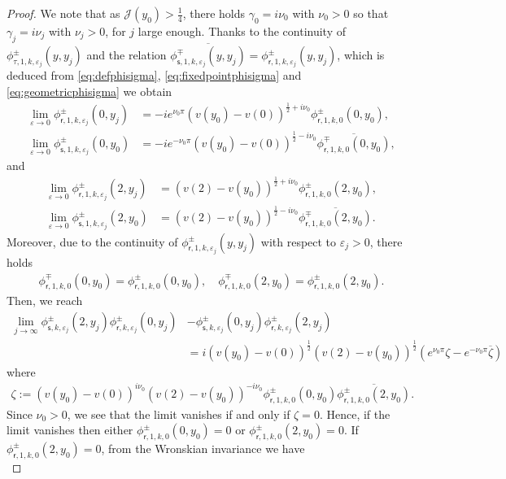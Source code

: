 \documentclass[11pt,reqno]{amsproc}
\theoremstyle{definition}
\numberwithin{equation}{section}
\newcommand{\cJ}{{\mathcal{J}}}
\newcommand{\sr}{{\mathsf{r}}}
\newcommand{\s}{{\mathsf{s}}}
\newcommand{\ep}{\varepsilon}
\begin{document}
\begin{proof}
We note that as $\cJ(y_0)>\frac14$, there holds $\gamma_0 = i \nu_0$ with $\nu_0>0$ so that $\gamma_j = i\nu_j$ with $\nu_j>0$, for $j$ large enough. Thanks to the continuity of $\phi_{\tau,1,k,\ep_j}^\pm(y,y_j)$ and the relation $\overline{\phi_{\s,1,k,\ep_j}^\mp(y,y_j)} = \phi_{\sr,1,k,\ep_j}^\pm(y,y_j)$, which is deduced from \eqref{eq:defphisigma}, \eqref{eq:fixedpointphisigma} and \eqref{eq:geometricphisigma} we obtain 
\begin{align*}
\lim_{\ep\rightarrow 0}\phi_{\sr,1,k,\ep_j}^\pm(0,y_j) &= -ie^{\nu_0\pi}(v(y_0)-v(0))^{\frac12+i\nu_0}\phi_{\sr,1,k,0}^\pm(0,y_0), \\ 
\lim_{\ep\rightarrow 0}\phi_{\s,1,k,\ep_j}^\pm(0,y_0) &= -ie^{-\nu_0\pi}(v(y_0)-v(0))^{\frac12-i\nu_0}\overline{\phi_{\sr,1,k,0}^\mp(0,y_0)},
\end{align*}
and 
\begin{align*}
\lim_{\ep\rightarrow 0}\phi_{\sr,1,k,\ep_j}^\pm(2,y_j) &= (v(2) - v(y_0))^{\frac12+i\nu_0}\phi_{\sr,1,k,0}^\pm(2,y_0), \\ 
\lim_{\ep\rightarrow 0}\phi_{\s,1,k,\ep_j}^\pm(2,y_0) &= (v(2) - v(y_0))^{\frac12-i\nu_0}\overline{\phi_{\sr,1,k,0}^\mp(2,y_0)}.
\end{align*}
Moreover, due to the continuity of $\phi_{\sr,1,k,\ep_j}^\pm(y,y_j)$ with respect to $\ep_j>0$, there holds
\begin{align*}
{\phi_{\sr,1,k,0}^\mp(0,y_0)} = {\phi_{\sr,1,k,0}^\pm(0,y_0)}, \quad {\phi_{\sr,1,k,0}^\mp(2,y_0)} = {\phi_{\sr,1,k,0}^\pm(2,y_0)}.
\end{align*}
Then, we reach
\begin{align*}
\lim_{j\rightarrow \infty} \phi_{\s,k,\ep_j}^\pm(2,y_j)\phi_{\sr,k,\ep_j}^\pm(0,y_j) &- \phi_{\s,k,\ep_j}^\pm(0,y_j)\phi_{\sr,k,\ep_j}^\pm(2,y_j) \\
&=i(v(y_0)-v(0))^\frac12(v(2)-v(y_0))^\frac12 \left( e^{\nu_0\pi}\zeta - e^{-\nu_0\pi}\overline{\zeta}\right)
\end{align*}
where
\begin{align*}
\zeta := (v(y_0)-v(0))^{i\nu_0}(v(2)-v(y_0))^{-i\nu_0}\phi_{\sr,1,k,0}^\pm(0,y_0)\overline{\phi_{\sr,1,k,0}^\pm(2,y_0)}.
\end{align*}
Since $\nu_0>0$, we see that the limit vanishes if and only if $\zeta=0$. Hence, if the limit vanishes then either $\phi_{\sr,1,k,0}^\pm(0,y_0)=0$ or $\phi_{\sr,1,k,0}^\pm(2,y_0)=0$. If $\phi_{\sr,1,k,0}^\pm(2,y_0) = 0$, from the Wronskian invariance we have
\begin{equation*}

\end{equation*}
\end{proof}
\end{document}
